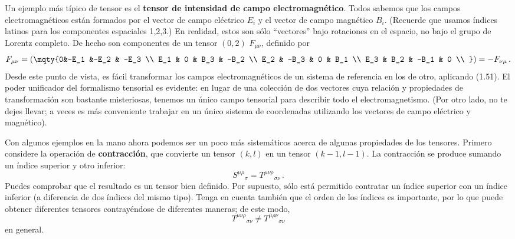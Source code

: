 \documentclass[11pt,b5paper,openany,twoside]{book}
\begin{document}
Un ejemplo más típico de tensor es el {\bf tensor de intensidad de campo electromagnético}.
Todos sabemos que los campos electromagnéticos están formados por el vector de campo eléctrico $E_i$ y el vector de campo magnético $B_i$.
(Recuerde que usamos índices latinos para los componentes espaciales 1,2,3.)
En realidad, estos son sólo ``vectores'' bajo rotaciones en el espacio, no bajo el grupo de Lorentz completo.
De hecho son componentes de un tensor $(0,2)$ $F_{\mu\nu}$, definido por
\begin{equation}
F_{\mu\nu} = \left(\mqty{0&-E_1 &-E_2 & -E_3 \\  E_1 & 0 & B_3 & -B_2 \\
E_2 & -B_3 & 0 & B_1 \\  E_3 & B_2 & -B_1 & 0  \\ }\right)
=-F_{\nu\mu}\,.\label{1.58}
\end{equation}
Desde este punto de vista, es fácil transformar los campos electromagnéticos de un sistema de referencia en los de otro, aplicando (1.51).
El poder unificador del formalismo tensorial es evidente: en lugar de una colección de dos vectores cuya relación y propiedades de transformación son bastante misteriosas, tenemos un único campo tensorial para describir todo el electromagnetismo.
(Por otro lado, no te dejes llevar; a veces es más conveniente trabajar en un único sistema de coordenadas utilizando los vectores de campo eléctrico y magnético).

Con algunos ejemplos en la mano ahora podemos ser un poco más sistemáticos acerca de algunas propiedades de los tensores.
Primero considere la operación de {\bf contracción}, que convierte un tensor $(k,l)$ en un tensor $(k-1,l-1)$.
La contracción se produce sumando un índice superior y otro inferior:
\begin{equation}
S^{\mu\rho}{}_\sigma = T^{\mu\nu\rho}{}_{\sigma\nu}\,.\label{1.59}
\end{equation}
Puedes comprobar que el resultado es un tensor bien definido.
Por supuesto, sólo está permitido contratar un índice superior con un índice inferior (a diferencia de dos índices del mismo tipo).
Tenga en cuenta también que el orden de los índices es importante, por lo que puede obtener diferentes tensores contrayéndose de diferentes maneras; de este modo,
\begin{equation}
T^{\mu\nu\rho}{}_{\sigma\nu}\neq T^{\mu\rho\nu}{}_{\sigma\nu}
\label{1.60}
\end{equation}
en general.
\end{document}
